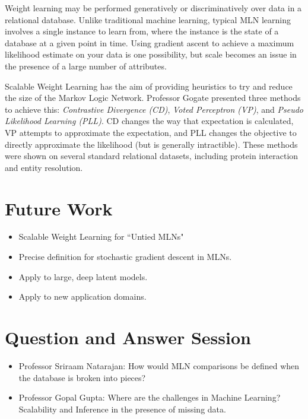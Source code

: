 \documentclass{article}
\begin{document}
Weight learning may be performed generatively or discriminatively over data in a relational database. Unlike traditional machine learning, typical MLN learning involves a single instance to learn from, where the instance is the state of a database at a given point in time. Using gradient ascent to achieve a maximum likelihood estimate on your data is one possibility, but scale becomes an issue in the presence of a large number of attributes.

Scalable Weight Learning has the aim of providing heuristics to try and reduce the size of the Markov Logic Network. Professor Gogate presented three methods to achieve this: \textit{Contrastive Divergence (CD)}, \textit{Voted Perceptron (VP)}, and \textit{Pseudo Likelihood Learning (PLL)}. CD changes the way that expectation is calculated, VP attempts to approximate the expectation, and PLL changes the objective to directly approximate the likelihood (but is generally intractible). These methods were shown on several standard relational datasets, including protein interaction and entity resolution.

\section{Future Work}

\begin{itemize}
    \item Scalable Weight Learning for ``Untied MLNs"
    \item Precise definition for stochastic gradient descent in MLNs.
    \item Apply to large, deep latent models.
    \item Apply to new application domains.
\end{itemize}

\section{Question and Answer Session}

\begin{itemize}
    \item Professor Sriraam Natarajan: How would MLN comparisons be defined when the database is broken into pieces?
    \item Professor Gopal Gupta: Where are the challenges in Machine Learning? Scalability and Inference in the presence of missing data.
\end{itemize}
\end{document}
